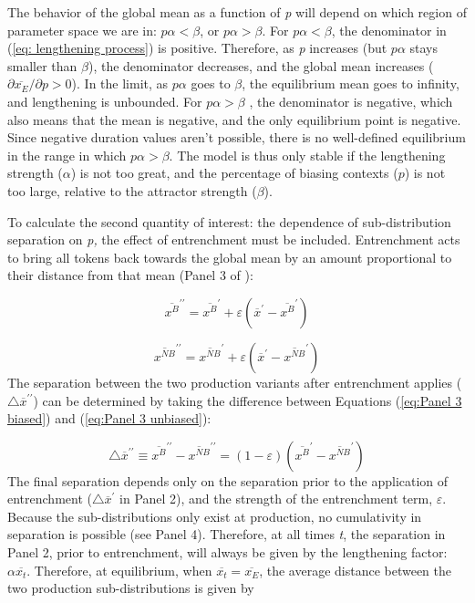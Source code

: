 The behavior of the global mean as a function of \emph{p} will depend
on which region of parameter space we are in: $p\alpha<\beta$, or
$p\alpha>\beta$. For $p\alpha<\beta$, the denominator in (\ref{eq: lengthening process})
is positive. Therefore, as \emph{p} increases (but $p\alpha$ stays
smaller than $\beta$), the denominator decreases, and the global
mean increases (${\partial\overline{x_{E}}}/{\partial p}>0$).
In the limit, as $p\alpha$ goes to $\beta$, the equilibrium mean
goes to infinity, and lengthening is unbounded. For $p\alpha>\beta$
, the denominator is negative, which also means that the mean is negative,
and the only equilibrium point is negative. Since negative duration
values aren't possible, there is no well-defined equilibrium in the
range in which $p\alpha>\beta$. The  model is thus
only stable if the lengthening strength ($\alpha$) is not too great,
and the percentage of biasing contexts ($p$) is not too large, relative
to the attractor strength ($\beta$).

To calculate the second quantity of interest: the dependence of sub-distribution
separation on \emph{p,} the effect of entrenchment must be included.
Entrenchment acts to bring all tokens back towards the global mean
by an amount proportional to their distance from that mean (Panel
3 of ): 

\begin{equation}
\overline{x^{B}}^{\prime\prime}=\overline{x^{B}}^{\prime}+\varepsilon\left(\overline{x}^{\prime}-\overline{x^{B}}^{\prime}\right)\label{eq:Panel 3 biased}
\end{equation}

\begin{equation}
\overline{x^{NB}}^{\prime\prime}=\overline{x^{NB}}^{\prime}+\varepsilon\left(\overline{x}^{\prime}-\overline{x^{NB}}^{\prime}\right)\label{eq:Panel 3 unbiased}
\end{equation}
The separation between the two production variants after entrenchment
applies ($\triangle\overline{x}^{\prime\prime}$) can be determined
by taking the difference between Equations (\ref{eq:Panel 3 biased})
and (\ref{eq:Panel 3 unbiased}): 

\begin{equation}
\triangle\overline{x}^{\prime\prime}\equiv\overline{x^{B}}^{\prime\prime}-\overline{x^{NB}}^{\prime\prime}=\left(1-\varepsilon\right)\left(\overline{x^{B}}^{\prime}-\overline{x^{NB}}^{\prime}\right)
\end{equation}
The final separation depends only on the separation prior to the application
of entrenchment ($\triangle\overline{x}^{\prime}$ in Panel 2), and
the strength of the entrenchment term, $\varepsilon$. Because the
sub-distributions only exist at production, no cumulativity in separation
is possible (see Panel 4). Therefore, at all times \emph{t}, the separation
in Panel 2, prior to entrenchment, will always be given by the lengthening
factor: $\alpha\overline{x_{t}}$. Therefore, at equilibrium, when
$\overline{x_{t}}=\overline{x_{E}}$, the average distance between
the two production sub-distributions is given by

